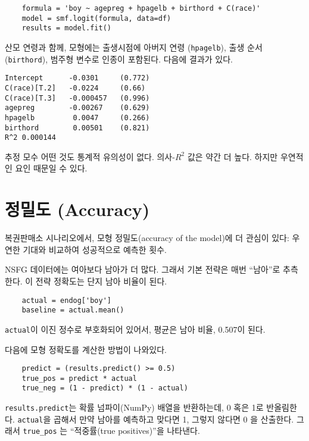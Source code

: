 \begin{verbatim}
    formula = 'boy ~ agepreg + hpagelb + birthord + C(race)'
    model = smf.logit(formula, data=df)
    results = model.fit()
\end{verbatim}

산모 연령과 함께, 모형에는 출생시점에 아버지 연령 ({\tt hpagelb}), 
출생 순서 ({\tt birthord}), 범주형 변수로 인종이 포함된다.
다음에 결과가 있다.

\begin{verbatim}
Intercept      -0.0301     (0.772)
C(race)[T.2]   -0.0224     (0.66)
C(race)[T.3]   -0.000457   (0.996)
agepreg        -0.00267    (0.629)
hpagelb         0.0047     (0.266)
birthord        0.00501    (0.821)
R^2 0.000144
\end{verbatim}

추정 모수 어떤 것도 통계적 유의성이 없다. 의사-$R^2$ 값은 약간 더 높다. 하지만 우연적인 요인 때문일 수 있다.


\section{정밀도 (Accuracy)}
\label{accuracy}

복권판매소 시나리오에서, 모형 정밀도(accuracy of the model)에 더 관심이 있다: 우연한 기대와 비교하여 성공적으로 예측한 횟수.


NSFG 데이터에는 여아보다 남아가 더 많다. 그래서 기본 전략은 매번 ``남아''로 추측한다. 이 전략 정확도는 단지 남아 비율이 된다.

\begin{verbatim}
    actual = endog['boy']
    baseline = actual.mean()
\end{verbatim}

{\tt actual}이 이진 정수로 부호화되어 있어서, 평균은 남아 비율, 0.507이 된다.

다음에 모형 정확도를 계산한 방법이 나와있다.

\begin{verbatim}
    predict = (results.predict() >= 0.5)
    true_pos = predict * actual
    true_neg = (1 - predict) * (1 - actual)
\end{verbatim}

{\tt results.predict}는 확률 넘파이(NumPy) 배열을 반환하는데, 0 혹은 1로 반올림한다. {\tt actual}을 곱해서 만약 남아를 예측하고 맞다면 1, 그렇지 않다면 0 을 산출한다. 그래서 \verb"true_pos" 는 ``적중률(true positives)''을 나타낸다.

